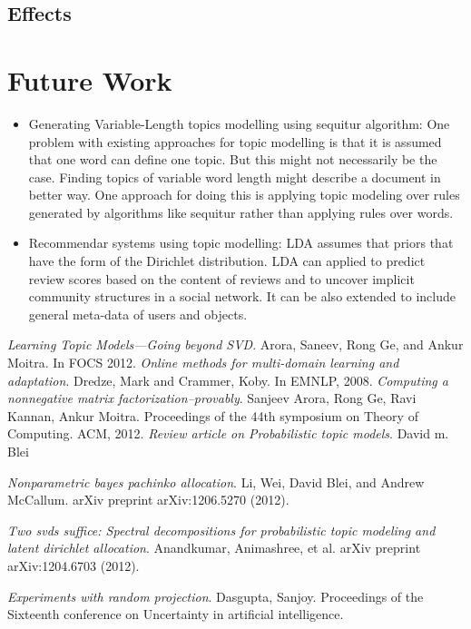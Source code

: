 \documentclass[a4paper,11pt]{article}
\begin{document}
\subsection{Effects}

\section{Future Work}

\begin{itemize}

\item Generating Variable-Length topics modelling using sequitur algorithm:
	One problem with existing approaches for topic modelling is that it is assumed that one word can define one topic. But this might not necessarily be the case. Finding topics of variable word length might describe a document in better way. One approach for doing this is applying topic modeling over rules generated by algorithms like sequitur rather than applying rules over words.

\item Recommendar systems using topic modelling:
	LDA assumes that priors that have the form of the Dirichlet distribution. LDA can applied to predict review scores based on the content of reviews and to uncover implicit community structures in a social network. It can be also extended to include general meta-data of users and objects.

\end{itemize}


\begin{thebibliography}{99}
 \textit{Learning Topic Models---Going beyond SVD}. Arora, Saneev, Rong Ge, and Ankur Moitra. In FOCS 2012.
 \textit{Online methods for multi-domain learning and adaptation}. Dredze, Mark and Crammer, Koby. In
EMNLP, 2008.
 \textit{Computing a nonnegative matrix factorization--provably}. Sanjeev Arora, Rong Ge, Ravi Kannan, Ankur Moitra. Proceedings of the 44th symposium on Theory of Computing. ACM, 2012.  
 \textit{Review article on Probabilistic topic models}. David m. Blei  

 \textit{Nonparametric bayes pachinko allocation}. Li, Wei, David Blei, and Andrew McCallum. arXiv preprint arXiv:1206.5270 (2012). 

 \textit{Two svds suffice: Spectral decompositions for probabilistic topic modeling and latent dirichlet allocation}. Anandkumar, Animashree, et al.  arXiv preprint arXiv:1204.6703 (2012).

 \textit{Experiments with random projection}. Dasgupta, Sanjoy. Proceedings of the Sixteenth conference on Uncertainty in artificial intelligence.


\end{thebibliography}

\pagebreak
\end{document}
